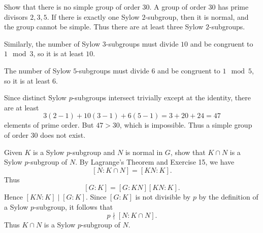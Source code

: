 \begin{problem}[Exercise 11]{
    Show that there is no simple group of order $30$.
}
    A group of order $30$ has prime divisors $2,3,5$.
    If there is exactly one Sylow $2$-subgroup, then it is normal, and the group cannot be simple.
    Thus there are at least three Sylow $2$-subgroups.

    Similarly, the number of Sylow $3$-subgroups must divide $10$ and be congruent to $1 \mod 3$, so it is at least $10$.

    The number of Sylow $5$-subgroups must divide $6$ and be congruent to $1 \mod 5$, so it is at least $6$.

    Since distinct Sylow $p$-subgroups intersect trivially except at the identity, there are at least
    \[
        3(2-1) + 10(3-1) + 6(5-1) = 3 + 20 + 24 = 47
    \]
    elements of prime order.
    But $47 > 30$, which is impossible.
    Thus a simple group of order $30$ does not exist.
\end{problem}

\begin{problem}[Exercise 12]{
    Given $K$ is a Sylow $p$-subgroup and $N$ is normal in $G$, show that $K \cap N$ is a Sylow $p$-subgroup of $N$.
}
    By Lagrange's Theorem and Exercise 15, we have
    \[
        [N : K \cap N] = [KN : K].
    \]
    Thus
    \[
        [G : K] = [G : KN][KN : K].
    \]
    Hence $[KN : K] \mid [G : K]$.
    Since $[G : K]$ is not divisible by $p$ by the definition of a Sylow $p$-subgroup, it follows that
    \[
        p \nmid [N : K \cap N].
    \]
    Thus $K \cap N$ is a Sylow $p$-subgroup of $N$.
\end{problem}